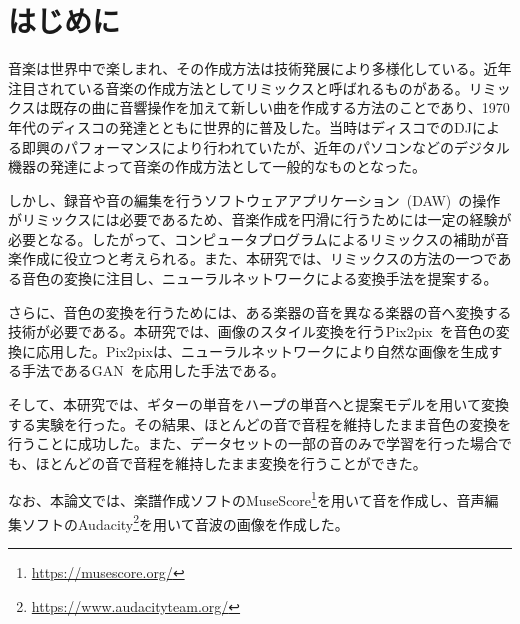 \chapter{はじめに}

音楽は世界中で楽しまれ、その作成方法は技術発展により多様化している。近年注目されている音楽の作成方法としてリミックスと呼ばれるものがある。リミックスは既存の曲に音響操作を加えて新しい曲を作成する方法のことであり、1970年代のディスコの発達とともに世界的に普及した。当時はディスコでのDJによる即興のパフォーマンスにより行われていたが、近年のパソコンなどのデジタル機器の発達によって音楽の作成方法として一般的なものとなった。

しかし、録音や音の編集を行うソフトウェアアプリケーション~(DAW)~の操作がリミックスには必要であるため、音楽作成を円滑に行うためには一定の経験が必要となる。したがって、コンピュータプログラムによるリミックスの補助が音楽作成に役立つと考えられる。また、本研究では、リミックスの方法の一つである音色の変換に注目し、ニューラルネットワークによる変換手法を提案する。

さらに、音色の変換を行うためには、ある楽器の音を異なる楽器の音へ変換する技術が必要である。本研究では、画像のスタイル変換を行うPix2pix~\cite{pix2pix}を音色の変換に応用した。Pix2pixは、ニューラルネットワークにより自然な画像を生成する手法であるGAN~\cite{GAN}を応用した手法である。

そして、本研究では、ギターの単音をハープの単音へと提案モデルを用いて変換する実験を行った。その結果、ほとんどの音で音程を維持したまま音色の変換を行うことに成功した。また、データセットの一部の音のみで学習を行った場合でも、ほとんどの音で音程を維持したまま変換を行うことができた。

なお、本論文では、楽譜作成ソフトのMuseScore\footnote{\url{https://musescore.org/}}を用いて音を作成し、音声編集ソフトのAudacity\footnote{\url{https://www.audacityteam.org/}}を用いて音波の画像を作成した。